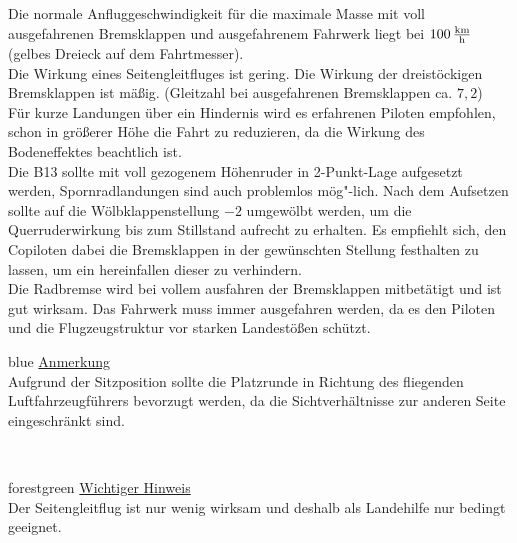 Die normale Anfluggeschwindigkeit für die maximale Masse mit voll ausgefahrenen Bremsklappen und ausgefahrenem Fahrwerk liegt bei $\unit[100]{\frac{km}{h}}$ (gelbes Dreieck auf dem Fahrtmesser).\\
Die Wirkung eines Seitengleitfluges ist gering. Die Wirkung der dreistöckigen Bremsklappen ist mäßig. (Gleitzahl bei ausgefahrenen Bremsklappen ca. $7,2$) \\
Für kurze Landungen über ein Hindernis wird es erfahrenen Piloten empfohlen, schon in größerer Höhe die Fahrt zu reduzieren, da die Wirkung des Bodeneffektes beachtlich ist.\\
Die B13 sollte mit voll gezogenem Höhenruder in 2-Punkt-Lage aufgesetzt werden, Spornradlandungen sind auch problemlos mög"-lich. Nach dem Aufsetzen sollte auf die Wölbklappenstellung $-2$ umgewölbt werden, um die Querruderwirkung bis zum Stillstand aufrecht zu erhalten. Es empfiehlt sich, den Copiloten dabei die Bremsklappen in der gewünschten Stellung festhalten zu lassen, um ein hereinfallen dieser zu verhindern. \\
Die Radbremse wird bei vollem ausfahren der Bremsklappen mitbetätigt und ist gut wirksam.
Das Fahrwerk muss immer ausgefahren werden, da es den Piloten und die Flugzeugstruktur vor starken Landestößen schützt.\\
\newline
\begin{color}{blue}
\large{\underline{Anmerkung}}\\
Aufgrund der Sitzposition sollte die Platzrunde in Richtung des fliegenden Luftfahrzeugführers bevorzugt werden, da die Sichtverhältnisse zur anderen Seite eingeschränkt sind.
\end{color}\\
\newline
\begin{color}{forestgreen}
\large{\underline{Wichtiger Hinweis}}\\
Der Seitengleitflug ist nur wenig wirksam und deshalb als Landehilfe nur bedingt geeignet.
\end{color}\\
